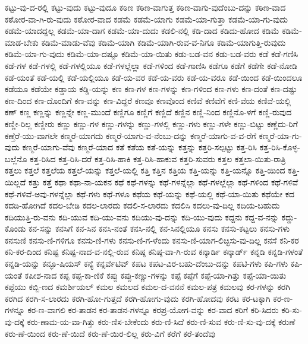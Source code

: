 {ಕಟ್ಟು-ವು-ದ-ರಲ್ಲಿ
ಕಟ್ಟು-ವುದು
ಕಟ್ಟು-ವುದೂ
ಕಠಿಣ
ಕಠಿಣ-ವಾಗುತ್ತ
ಕಠಿಣ-ವಾಗು-ವುದೆಂಬು-ದನ್ನು
ಕಠಿಣ-ವಾದ
ಕಠೋರ-ವಾ-ಗಿ-ರು-ವುದು
ಕಠೋರ-ವಾದ
ಕಡಮೆ
ಕಡಮೆ-ಯಾಗು
ಕಡಮೆ-ಯಾ-ಗುತ್ತಾ
ಕಡಮೆ-ಯಾ-ಗು-ವುದು
ಕಡಮೆ-ಯಾದದ್ದಲ್ಲ
ಕಡಮೆ-ಯಾ-ದಾಗ
ಕಡಮೆ-ಯಾ-ದುದು
ಕಡಲಿ-ನಲ್ಲಿ
ಕಡಿ-ದಾದ
ಕಡಿದು-ಹೋದ
ಕಡಿಮೆ
ಕಡಿಮೆ-ಮಾಡ-ಬೇಕು
ಕಡಿಮೆ-ಮಾಡು-ವೆವು
ಕಡಿಮೆ-ಯಾಗಿ
ಕಡಿಮೆ-ಯಾಗಿ-ರುವ-ವ-ನಿಗೂ
ಕಡಿಮೆ-ಯಾಗುತ್ತಿ-ರುವುದು
ಕಡಿಮೆ-ಯಾ-ಗು-ವುದು
ಕಡಿಮೆ-ಯಾ-ದಷ್ಟೂ
ಕಡಿಮೆ-ಯಾ-ಯಿತು
ಕಡು-ಬಡ-ವನ
ಕಡು-ಬಡ-ವರು
ಕಡೆ
ಕಡೆ-ಗಣಿಸಿ
ಕಡೆ-ಗಳ
ಕಡೆ-ಗಳಲ್ಲಿ
ಕಡೆ-ಗಳಲ್ಲಿಯೂ
ಕಡೆ-ಗಳಲ್ಲೆಲ್ಲಾ
ಕಡೆ-ಗಳಿಂದ
ಕಡೆ-ಗಾಣಿಸಿ
ಕಡೆಗೂ
ಕಡೆಗೆ
ಕಡೆಗೇ
ಕಡೆ-ನೋಡಿ
ಕಡೆ-ಯಂತೆ
ಕಡೆ-ಯಲ್ಲಿ
ಕಡೆ-ಯಲ್ಲಿಯೂ
ಕಡೆ-ಯ-ವರ
ಕಡೆ-ಯ-ವರು
ಕಡೆ-ಯ-ವರೂ
ಕಡೆ-ಯಿಂದ
ಕಡೆ-ಯಿಂದಲೂ
ಕಡೆಯೂ
ಕಡೆಯೇ
ಕಡ್ಡಾಯ
ಕಡ್ಡಿ-ಯನ್ನು
ಕಣ
ಕಣ-ಗಳ
ಕಣ-ಗಳನ್ನು
ಕಣ-ಗಳಿಂದ
ಕಣ-ಗಳು
ಕಣ-ದಂತೆ
ಕಣ-ದಷ್ಟು
ಕಣ-ದಿಂದ
ಕಣ-ದೊಂದಿಗೆ
ಕಣ-ವನ್ನು
ಕಣ-ವಿದ್ದರೆ
ಕಣವೂ
ಕಣವೊಂದ
ಕಣಿವೆ
ಕಣಿವೆಗೆ
ಕಣಿ-ವೆಯ
ಕಣಿವೆ-ಯಲ್ಲಿ
ಕಣ್
ಕಣ್ಣ
ಕಣ್ಣನ್ನು
ಕಣ್ಣನ್ನೇ
ಕಣ್ಣ-ಮುಂದೆ
ಕಣ್ಣಿಗೂ
ಕಣ್ಣಿಗೆ
ಕಣ್ಣಿದೆ
ಕಣ್ಣಿನ
ಕಣ್ಣಿ-ನಿಂದ
ಕಣ್ಣಿನೊ-ಳಗೆ
ಕಣ್ಣಿ-ರುವುದ
ಕಣ್ಣೀ-ರಿಲ್ಲ
ಕಣ್ಣೀರು
ಕಣ್ಣು
ಕಣ್ಣು-ಗಳ
ಕಣ್ಣು-ಗಳನ್ನು
ಕಣ್ಣು-ಗಳಲ್ಲಿ
ಕಣ್ಣು-ಗಳು
ಕಣ್ಣು-ಗಳೇ
ಕಣ್ಣು-ಬಿಟ್ಟು
ಕಣ್ಣೆದು-ರಿಗೆ
ಕಣ್ತೆರೆ-ಯು-ವಾಗಲೇ
ಕಣ್ಮರೆ-ಯಾಗದು
ಕಣ್ಮರೆ-ಯಾಗು-ವ-ನೆಂಬು-ದನ್ನು
ಕಣ್ಮರೆ-ಯಾಗು-ವ-ವ-ರೆಗೆ
ಕಣ್ಮರೆ-ಯಾ-ಗು-ವುದು
ಕಣ್ಮರೆ-ಯಾಗು-ವೆವು
ಕಣ್ಮರೆ-ಯಾದ
ಕತೆ
ಕತೆಯ
ಕತೆ-ಯನ್ನು
ಕತ್ತನ್ನು
ಕತ್ತರಿ-ಸಲ್ಪಟ್ಟು
ಕತ್ತ-ರಿಸಿ
ಕತ್ತ-ರಿಸಿ-ಕೊಳ್ಳ-ಬಲ್ಲೆನೊ
ಕತ್ತ-ರಿಸಿದ
ಕತ್ತ-ರಿಸಿ-ದರೆ
ಕತ್ತ-ರಿಸಿ-ಹಾಕಿ
ಕತ್ತ-ರಿಸಿ-ಹಾಕುವ
ಕತ್ತರಿ-ಸುವರು
ಕತ್ತಲ
ಕತ್ತಲಾ-ಯಿತು-ರಾತ್ರಿ
ಕತ್ತಲು
ಕತ್ತಲೆ
ಕತ್ತಲೆಯ
ಕತ್ತಲೆ-ಯನ್ನು
ಕತ್ತಲೆ-ಯಲ್ಲಿ
ಕತ್ತಿ
ಕತ್ತಿನ
ಕತ್ತಿಯ
ಕತ್ತಿ-ಯನ್ನು
ಕತ್ತಿ-ಯನ್ನೊ
ಕತ್ತಿ-ಯಿಂದ
ಕತ್ತಿ-ಯಿಲ್ಲದೆ
ಕತ್ತು
ಕತ್ತೆ
ಕಥಾ
ಕಥಾ-ನಾ-ಯಕನ
ಕಥೆ
ಕಥೆ-ಗಳನ್ನು
ಕಥೆ-ಗಳನ್ನೆಲ್ಲಾ
ಕಥೆ-ಗಳಲ್ಲೆಲ್ಲಾ
ಕಥೆ-ಗಳಿಂದ
ಕಥೆ-ಗಳಿವೆ
ಕಥೆ-ಗಳಿವೆ-ಅವು-ಗಳನ್ನೆಲ್ಲಾ
ಕಥೆ-ಗಳು
ಕಥೆ-ಗಳೂ
ಕಥೆಯ
ಕಥೆ-ಯನ್ನು
ಕಥೆ-ಯಲ್ಲಿ
ಕಥೆ-ಯಾ-ಯಿತು
ಕಥೆಯೇ
ಕದ
ಕದಡಿ-ಹೋಗಿದೆ
ಕದಲ-ಬೇಡಿ
ಕದಲ-ಲಾರದು
ಕದಲಿ-ಸ-ಲಾರದು
ಕದಲಿಸಿ
ಕದಲು-ವು-ದಿಲ್ಲ
ಕದಿಯ-ಬಹುದು
ಕದಿಯುತ್ತಿ-ರು-ವನು
ಕದಿ-ಯುವ
ಕದಿ-ಯು-ವನು
ಕದಿಯು-ವು-ದನ್ನು
ಕದಿ-ಯು-ವುದು
ಕದ್ದನು
ಕದ್ದ-ವ-ನನ್ನು
ಕದ್ದು-ಕೊಂಡು
ಕನ-ಸನ್ನು
ಕನಸಿಗೆ
ಕನ-ಸಿನ
ಕನಸಿ-ನಂತೆ
ಕನಸಿ-ನಲ್ಲಿ
ಕನ-ಸಿನಲ್ಲಿಯೂ
ಕನಸು
ಕನಸು-ಕಟ್ಟಲು
ಕನಸು-ಗಳು
ಕನಸುಣಿ
ಕನಸು-ಣಿ-ಗಳಿಗೂ
ಕನಸು-ಣಿ-ಗಳು
ಕನಸು-ಣಿ-ಗ-ಳೆಂದು
ಕನಸು-ಣಿ-ಯಾಗ-ಲಿಚ್ಛಿಸು-ವು-ದಿಲ್ಲ
ಕನಸೆ
ಕನಿ-ಕರ
ಕನಿ-ಕರ-ದಿಂದ
ಕನಿಷ್ಟ
ಕನಿಷ್ಟ-ನಾದ-ವ-ನಲ್ಲಿ-ರುವ
ಕನಿಷ್ಠ
ಕನಿಷ್ಠ-ವಾ-ಗಿ-ರುವ
ಕನ್ಕಾರ್ಡಿ
ಕನ್ಕಾರ್ಡ್
ಕನ್ನಡಿ
ಕನ್ನಡಿ-ಗಳಂತೆ
ಕನ್ನಡಿ-ಯನ್ನು
ಕನ್ಫೂ-ಷಿಯಸ್
ಕನ್ಯೆ
ಕನ್ಸರ್ವೆಟಿವ್
ಕಪಟ
ಕಪಟ-ವಿರ-ಬಹು-ದೆಂಬು-ದನ್ನು
ಕಪಟಿ-ಗಳು
ಕಪಿ-ಗಳು
ಕಪಿ-ಯಂತೆ
ಕಪೀಶ-ನಾದ
ಕಪ್ಪ
ಕಪ್ಪ-ಕಾ-ಣಿಕೆ
ಕಪ್ಪು
ಕಪ್ಪು-ಕಣ್ಣು-ಗಳನ್ನು
ಕಪ್ಪೆ
ಕಪ್ಪೆಗೆ
ಕಪ್ಪೆ-ಯಾ-ಗಿತ್ತು
ಕಪ್ಪೆ-ಯಾ-ಯಿತು
ಕಪ್ಪೆಯು
ಕಬ್ಬಿ-ಣದ
ಕಮರ್ಶಿಯಲ್
ಕಮಲ
ಕಮಲದ
ಕಮಲ-ದ-ವನನೆ
ಕಮಲ-ಪತ್ರ
ಕಮಲವು
ಕರ-ಗಳನ್ನು
ಕರಗಿ
ಕರಗಿದ
ಕರಗಿ-ಸ-ಲಾರದು
ಕರಗಿ-ಹೋ-ಗುತ್ತದೆ
ಕರಗಿ-ಹೋಗು-ವುದು
ಕರಗಿ-ಹೋದವು
ಕರಟ
ಕರ-ಟಕ್ಕಾಗಿ
ಕರ-ಣ-ಗಳನ್ನೂ
ಕರ-ಣ-ವಾಗಲಿ
ಕರ-ತಾಡನ
ಕರ-ತಾಡನ-ಗಳನ್ನೂ
ಕರಪ್ರ-ಯೋಗ-ವನ್ನು
ಕರ-ವಾದ
ಕರಿಗೆ
ಕರಿ-ಸಿದರು
ಕರಿ-ಸು-ವು-ದಕ್ಕೆ
ಕರು-ಣಾಮ-ಯ-ವಾ-ಗಿತ್ತು
ಕರು-ಣಿಸ-ಬೇಕೆಂದು
ಕರು-ಣಿ-ಸಿದೆ
ಕರು-ಣಿ-ಸುವ
ಕರು-ಣಿ-ಸು-ವು-ದಕ್ಕೆ
ಕರುಣೆ
ಕರು-ಣೆ-ಯಿಂದ
ಕರು-ಣೆ-ಯಿದೆ
ಕರು-ಣೆ-ಯಿರ-ಲಿಲ್ಲ
ಕರು-ವಿಗೆ
ಕರೆಗೆ
ಕರೆ-ತಂದೆವು
}
